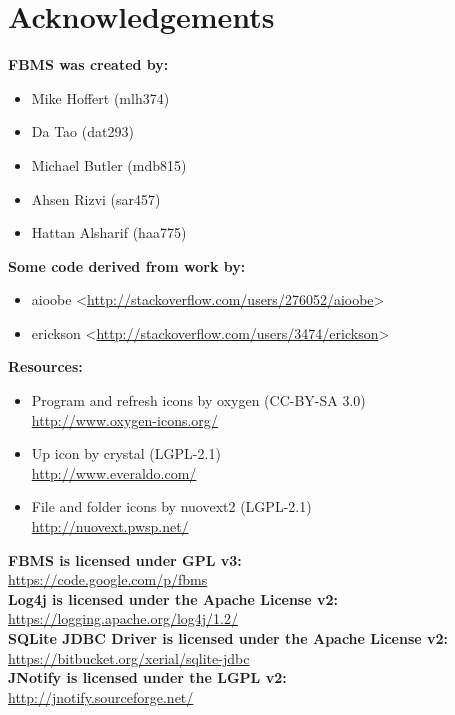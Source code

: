 \documentclass[12pt,a4paper]{article}
\begin{document}
\section{Acknowledgements}
\textbf{FBMS was created by:}
\begin{itemize}
\item Mike Hoffert (mlh374)
\item Da Tao (dat293)
\item Michael Butler (mdb815)
\item Ahsen Rizvi (sar457)
\item Hattan Alsharif (haa775)
\end{itemize}

\textbf{Some code derived from work by:}
\begin{itemize}
\item aioobe <\url{http://stackoverflow.com/users/276052/aioobe}>
\item erickson <\url{http://stackoverflow.com/users/3474/erickson}>
\end{itemize}

\textbf{Resources:}
\begin{itemize}
\item Program and refresh icons by oxygen (CC-BY-SA 3.0) \\
\url{http://www.oxygen-icons.org/}
\item Up icon by crystal (LGPL-2.1) \\
\url{http://www.everaldo.com/}
\item File and folder icons by nuovext2 (LGPL-2.1) \\
\url{http://nuovext.pwsp.net/}
\end{itemize}

\textbf{FBMS is licensed under GPL v3:} \\
\url{https://code.google.com/p/fbms} \\

\textbf{Log4j is licensed under the Apache License v2:} \\
\url{https://logging.apache.org/log4j/1.2/} \\

\textbf{SQLite JDBC Driver is licensed under the Apache License v2:} \\
\url{https://bitbucket.org/xerial/sqlite-jdbc} \\

\textbf{JNotify is licensed under the LGPL v2:} \\
\url{http://jnotify.sourceforge.net/} \\
\end{document}
